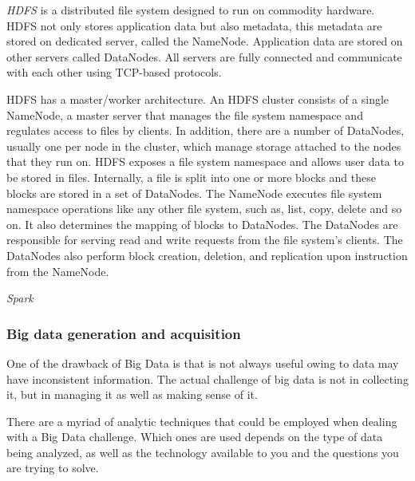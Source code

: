 \emph{HDFS} is a distributed file system designed to run on commodity hardware.  HDFS not only  stores application data but also metadata, this metadata are stored on dedicated server, called the NameNode. Application data are stored on other servers called DataNodes. All servers are fully connected and communicate with each other using TCP-based protocols.

HDFS has a master/worker architecture. An HDFS cluster consists of a single NameNode, a master server that manages the file system namespace and regulates access to files by clients.
In addition, there are a number of DataNodes, usually one per node in the cluster, which
manage storage attached to the nodes that they run on. HDFS exposes a file system
namespace and allows user data to be stored in files. Internally, a file is split into one or more blocks and these blocks are stored in a set of DataNodes. The NameNode executes file
system namespace operations like any other file system, such as, list, copy, delete and so on. It
also determines the mapping of blocks to DataNodes. The DataNodes are responsible for
serving read and write requests from the file system’s clients. The DataNodes also perform
block creation, deletion, and replication upon instruction from the NameNode.

\emph{Spark}
\subsubsection{Big data generation and acquisition}
One of the drawback of Big Data is that is not always useful owing to data may have inconsistent information. The actual challenge of big data is not in collecting it, but in managing it as well as making sense of it.

There are a myriad of analytic techniques that could be employed when dealing with a Big Data challenge. Which ones are used depends on the type of data being analyzed, as well as the technology available to you and the questions you are trying to solve. 

